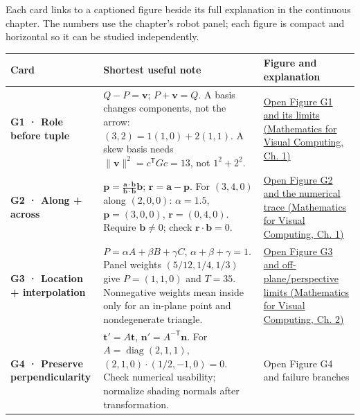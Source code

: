 Each card links to a captioned figure beside its full explanation in the continuous chapter. The numbers use the chapter's robot panel; each figure is compact and horizontal so it can be studied independently.

{\def\LTcaptype{none} %
\begin{longtable}[]{@{}
  >{\raggedright\arraybackslash}p{}
  >{\raggedright\arraybackslash}p{}
  >{\raggedright\arraybackslash}p{}@{}}
\toprule\noalign{}
\begin{minipage}[b]{\linewidth}\raggedright
Card
\end{minipage} & \begin{minipage}[b]{\linewidth}\raggedright
Shortest useful note
\end{minipage} & \begin{minipage}[b]{\linewidth}\raggedright
Figure and explanation
\end{minipage} \\
\midrule\noalign{}
\endhead
\bottomrule\noalign{}
\endlastfoot
\textbf{G1 · Role before tuple} & \(Q-P=\mathbf v\); \(P+\mathbf v=Q\). A basis changes components, not the arrow: \((3,2)=1(1,0)+2(1,1)\). A skew basis needs \(\|\mathbf v\|^2=c^\mathsf TGc=13\), not \(1^2+2^2\). & \href{../02-Mathematics-for-Visual-Computing/main.pdf\#nameddest=01-foundations-i-ch017-g1---one-movement-two-descriptions}{Open Figure G1 and its limits (Mathematics for Visual Computing, Ch. 1)} \\
\textbf{G2 · Along + across} & \(\mathbf p=\frac{\mathbf a\cdot\mathbf b}{\mathbf b\cdot\mathbf b}\mathbf b\); \(\mathbf r=\mathbf a-\mathbf p\). For \((3,4,0)\) along \((2,0,0)\): \(\alpha=1.5\), \(\mathbf p=(3,0,0)\), \(\mathbf r=(0,4,0)\). Require \(\mathbf b\ne0\); check \(\mathbf r\cdot\mathbf b=0\). & \href{../02-Mathematics-for-Visual-Computing/main.pdf\#nameddest=01-foundations-i-ch017-g2---split-the-request-into-rail-travel-and-sideways-travel}{Open Figure G2 and the numerical trace (Mathematics for Visual Computing, Ch. 1)} \\
\textbf{G3 · Location + interpolation} & \(P=\alpha A+\beta B+\gamma C\), \(\alpha+\beta+\gamma=1\). Panel weights \((5/12,1/4,1/3)\) give \(P=(1,1,0)\) and \(T=35\). Nonnegative weights mean inside only for an in-plane point and nondegenerate triangle. & \href{../02-Mathematics-for-Visual-Computing/main.pdf\#nameddest=01-foundations-i-ch018-g3---reconstruct-a-sensor-location-from-the-corners}{Open Figure G3 and off-plane/perspective limits (Mathematics for Visual Computing, Ch. 2)} \\
\textbf{G4 · Preserve perpendicularity} & \(\mathbf t'=A\mathbf t\), \(\mathbf n'=A^{-\mathsf T}\mathbf n\). For \(A=\operatorname{diag}(2,1,1)\), \((2,1,0)\cdot(1/2,-1,0)=0\). Check numerical usability; normalize shading normals after transformation. & {Open Figure G4 and failure branches} \\
\end{longtable}
}


